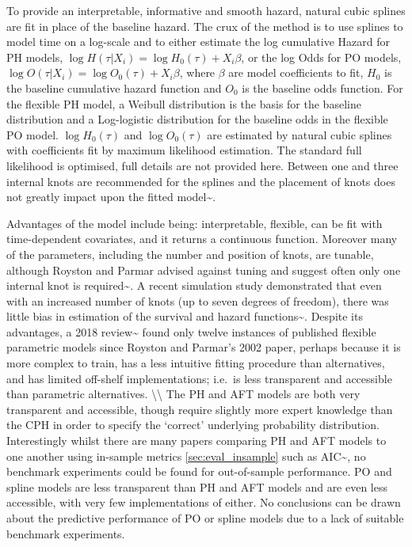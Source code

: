 \documentclass[
  letterpaper,
]{scrbook}
\theoremstyle{plain}
\theoremstyle{definition}
\theoremstyle{remark}
\begin{document}
To provide an interpretable, informative and smooth hazard, natural
cubic splines are fit in place of the baseline hazard. The crux of the
method is to use splines to model time on a log-scale and to either
estimate the log cumulative Hazard for PH models,
\(\log H(\tau|X_i) = \log H_0(\tau) + X_i\beta\), or the log Odds for PO
models, \(\log O(\tau|X_i) = \log O_0(\tau) + X_i\beta\), where
\(\beta\) are model coefficients to fit, \(H_0\) is the baseline
cumulative hazard function and \(O_0\) is the baseline odds function.
For the flexible PH model, a Weibull distribution is the basis for the
baseline distribution and a Log-logistic distribution for the baseline
odds in the flexible PO model. \(\log H_0(\tau)\) and \(\log O_0(\tau)\)
are estimated by natural cubic splines with coefficients fit by maximum
likelihood estimation. The standard full likelihood is optimised, full
details are not provided here. Between one and three internal knots are
recommended for the splines and the placement of knots does not greatly
impact upon the fitted model\textasciitilde{}\cite{RoystonParmar2002}.

Advantages of the model include being: interpretable, flexible, can be
fit with time-dependent covariates, and it returns a continuous
function. Moreover many of the parameters, including the number and
position of knots, are tunable, although Royston and Parmar advised
against tuning and suggest often only one internal knot is
required\textasciitilde{}\cite{RoystonParmar2002}. A recent simulation
study demonstrated that even with an increased number of knots (up to
seven degrees of freedom), there was little bias in estimation of the
survival and hazard functions\textasciitilde{}\cite{Bower2019}. Despite
its advantages, a 2018 review\textasciitilde{}\cite{Ng2018} found only
twelve instances of published flexible parametric models since Royston
and Parmar's 2002 paper, perhaps because it is more complex to train,
has a less intuitive fitting procedure than alternatives, and has
limited off-shelf implementations; i.e.~is less transparent and
accessible than parametric alternatives. \textbackslash\textbackslash{}
The PH and AFT models are both very transparent and accessible, though
require slightly more expert knowledge than the CPH in order to specify
the `correct' underlying probability distribution. Interestingly whilst
there are many papers comparing PH and AFT models to one another using
in-sample metrics \ref{sec:eval_insample} such as
AIC\textasciitilde{}\cite{Georgousopoulou2015,Habibi2018,Moghimi-dehkordi2008,Zare2015},
no benchmark experiments could be found for out-of-sample performance.
PO and spline models are less transparent than PH and AFT models and are
even less accessible, with very few implementations of either. No
conclusions can be drawn about the predictive performance of PO or
spline models due to a lack of suitable benchmark experiments.
\end{document}
